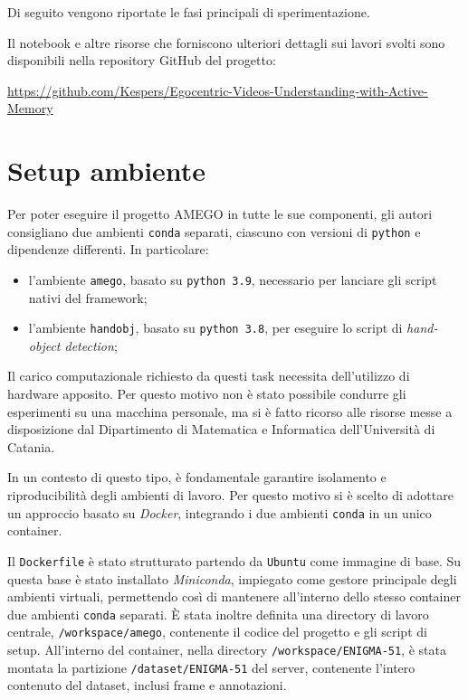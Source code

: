 Di seguito vengono riportate le fasi principali di sperimentazione.

Il notebook e altre risorse che forniscono ulteriori dettagli sui lavori svolti sono disponibili nella repository GitHub del progetto: 
\begin{center}
    \footnotesize
    \href{https://github.com/Kespers/Egocentric-Videos-Understanding-with-Active-Memory}{https://github.com/Kespers/Egocentric-Videos-Understanding-with-Active-Memory}
\end{center}

\section{Setup ambiente}

Per poter eseguire il progetto AMEGO in tutte le sue componenti, gli autori consigliano due ambienti \texttt{conda} separati, ciascuno con versioni di \texttt{python} e dipendenze differenti. In particolare:
\begin{itemize}
    \item l'ambiente \texttt{amego}, basato su \texttt{python 3.9}, necessario per lanciare gli script nativi del framework;
    \item l'ambiente \texttt{handobj}, basato su \texttt{python 3.8}, per eseguire lo script di \emph{hand-object detection};
\end{itemize}

Il carico computazionale richiesto da questi task necessita dell'utilizzo di hardware apposito. Per questo motivo non è stato possibile condurre gli esperimenti su una macchina personale, ma si è fatto ricorso alle risorse messe a disposizione dal Dipartimento di Matematica e Informatica dell'Università di Catania.  

In un contesto di questo tipo, è fondamentale garantire isolamento e riproducibilità degli ambienti di lavoro. Per questo motivo si è scelto di adottare un approccio basato su \emph{Docker}, integrando i due ambienti \texttt{conda} in un unico container.

Il \texttt{Dockerfile} è stato strutturato partendo da \texttt{Ubuntu} come immagine di base. Su questa base è stato installato \emph{Miniconda}, impiegato come gestore principale degli ambienti virtuali, permettendo così di mantenere all'interno dello stesso container due ambienti \texttt{conda} separati.  
È stata inoltre definita una directory di lavoro centrale, \texttt{/workspace/amego}, contenente il codice del progetto e gli script di setup. All'interno del container, nella directory \texttt{/workspace/ENIGMA-51}, è stata montata la partizione \texttt{/dataset/ENIGMA-51} del server, contenente l'intero contenuto del dataset, inclusi frame e annotazioni.

